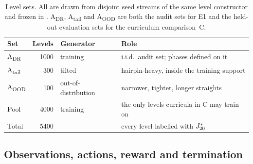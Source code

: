 \begin{table}[t]
\centering
\small
\caption{Level sets. All are drawn from disjoint seed streams of the same level
constructor and frozen in . A\textsubscript{DR}, A\textsubscript{tail} and
A\textsubscript{OOD} are both the audit sets for E1 and the held-out evaluation sets for
the curriculum comparison~C.}
\label{tab:levelsets}
\begin{tabular}{@{}lrll@{}}
\toprule
Set & Levels & Generator & Role \\
\midrule
A\textsubscript{DR} & \num{1000} & training & i.i.d.\ audit set; phases defined on it \\
A\textsubscript{tail} & 300 & tilted & hairpin-heavy, inside the training support \\
A\textsubscript{OOD} & 100 & out-of-distribution & narrower, tighter, longer straights \\
Pool & \num{4000} & training & the only levels curricula in C may train on \\
\midrule
Total & \num{5400} & & every level labelled with $J^{*}_{20}$ \\
\bottomrule
\end{tabular}
\end{table}

\subsection{Observations, actions, reward and termination}
\label{sec:env-mdp}

